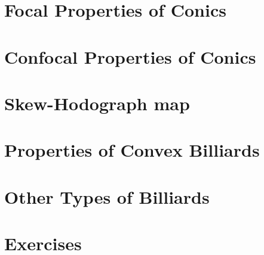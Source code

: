 \section{Focal Properties of Conics}
\label{sec:09-focal}


\section{Confocal Properties of Conics}
\label{sec:09-confocal}


\section{Skew-Hodograph map}
\label{sec:09-hodograph}


\section{Properties of Convex Billiards}
\label{sec:09-convex_billiard}


\section{Other Types of Billiards}
\label{sec:09-other-billiards}


\section{Exercises}
\label{sec:09-exercises}



